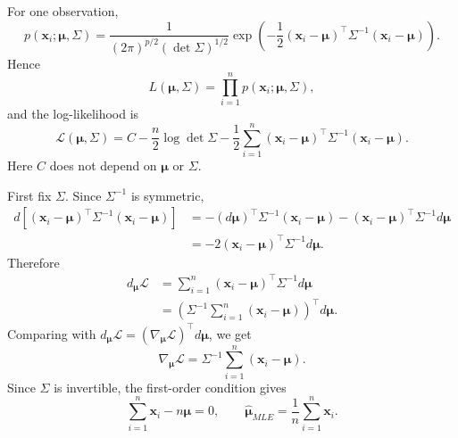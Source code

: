 \begin{pfbox}
For one observation,
\[
    p(\mathbf{x}_i;\boldsymbol{\mu},\Sigma)
    =
    \frac{1}{(2\pi)^{p/2}(\det\Sigma)^{1/2}}
    \exp\left(
        -\frac{1}{2}
        (\mathbf{x}_i-\boldsymbol{\mu})^{\top}
        \Sigma^{-1}
        (\mathbf{x}_i-\boldsymbol{\mu})
    \right).
\]
Hence
\[
    L(\boldsymbol{\mu},\Sigma)
    =
    \prod_{i=1}^n p(\mathbf{x}_i;\boldsymbol{\mu},\Sigma),
\]
and the log-likelihood is
\[
    \mathcal{L}(\boldsymbol{\mu},\Sigma)
    =
    C
    -
    \frac{n}{2}\log\det\Sigma
    -
    \frac{1}{2}\sum_{i=1}^n
    (\mathbf{x}_i-\boldsymbol{\mu})^{\top}
    \Sigma^{-1}
    (\mathbf{x}_i-\boldsymbol{\mu}).
\]
Here $C$ does not depend on $\boldsymbol{\mu}$ or $\Sigma$.

First fix $\Sigma$. Since $\Sigma^{-1}$ is symmetric,
\[
\begin{aligned}
    d\left[
        (\mathbf{x}_i-\boldsymbol{\mu})^{\top}
        \Sigma^{-1}
        (\mathbf{x}_i-\boldsymbol{\mu})
    \right]
    &=
    -(d\boldsymbol{\mu})^{\top}\Sigma^{-1}(\mathbf{x}_i-\boldsymbol{\mu})
    -
    (\mathbf{x}_i-\boldsymbol{\mu})^{\top}\Sigma^{-1}d\boldsymbol{\mu} \\
    &=
    -2(\mathbf{x}_i-\boldsymbol{\mu})^{\top}\Sigma^{-1}d\boldsymbol{\mu}.
\end{aligned}
\]
Therefore
\[
\begin{aligned}
    d_{\boldsymbol{\mu}}\mathcal{L}
    &=
    \sum_{i=1}^n
    (\mathbf{x}_i-\boldsymbol{\mu})^{\top}\Sigma^{-1}d\boldsymbol{\mu} \\
    &=
    \left(
        \Sigma^{-1}\sum_{i=1}^n(\mathbf{x}_i-\boldsymbol{\mu})
    \right)^{\top}d\boldsymbol{\mu}.
\end{aligned}
\]
Comparing with
$d_{\boldsymbol{\mu}}\mathcal{L}=(\nabla_{\boldsymbol{\mu}}\mathcal{L})^{\top}d\boldsymbol{\mu}$,
we get
\[
    \nabla_{\boldsymbol{\mu}}\mathcal{L}
    =
    \Sigma^{-1}\sum_{i=1}^n(\mathbf{x}_i-\boldsymbol{\mu}).
\]
Since $\Sigma$ is invertible, the first-order condition gives
\[
    \sum_{i=1}^n\mathbf{x}_i-n\boldsymbol{\mu}=0,
    \qquad
    \widehat{\boldsymbol{\mu}}_{MLE}
    =
    \frac{1}{n}\sum_{i=1}^n \mathbf{x}_i.
\]


\end{pfbox}
